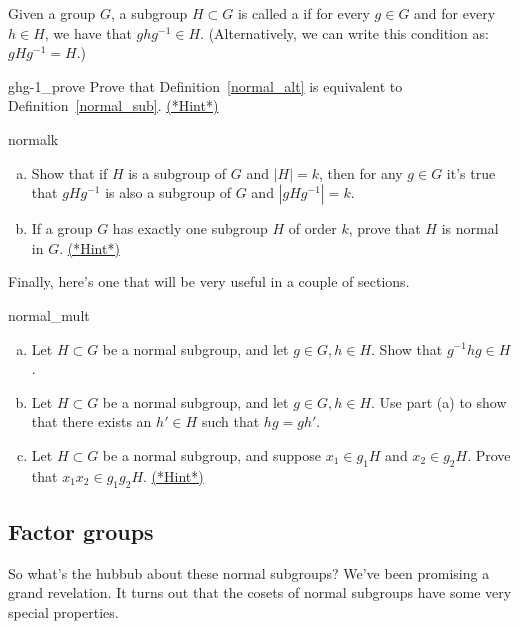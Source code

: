 {\begin{defn}\label{normal_alt}
 Given a group $G$, a subgroup $H \subset G$ is called a 
 if for every $g \in G$ and for every $h \in H$, we have that $ghg^{-1} \in H$.  (Alternatively, we can write this condition as: $gHg^{-1} = H$.)
\end{defn}

\begin{exercise}{ghg-1_prove}
Prove that Definition~\ref{normal_alt} is equivalent to Definition~\ref{normal_sub}.
\hyperref[sec:cosets:hints]{(*Hint*)}
\end{exercise}


\begin{exercise}{normalk}
\begin{enumerate}[(a)]
\item
Show that if $H$ is a subgroup of $G$ and $|H|=k$, then for any $g \in G$ it's true that $gHg^{-1}$ is also a subgroup of $G$ and $|gHg^{-1}|=k$.
\item
If a group $G$ has exactly one subgroup $H$ of order $k$, prove that
$H$ is normal in $G$.
\hyperref[sec:cosets:hints]{(*Hint*)}
\end{enumerate}
\end{exercise}

Finally, here's one that will be very useful in a couple of sections.

\begin{exercise}{normal_mult}
\begin{enumerate}[(a)]
\item
Let $H \subset G$ be a normal subgroup, and let $g \in G, h \in H$.  Show that $g^{-1}hg \in H$.
\item
Let $H \subset G$ be a normal subgroup, and let $g \in G, h \in H$. Use part (a) to show that there exists an $h' \in H$ such that $hg = g h'$.
\item
Let $H \subset G$ be a normal subgroup, and suppose $x_1 \in g_1H$ and $x_2 \in g_2H$. Prove that $x_1x_2 \in g_1g_2H$.
\hyperref[sec:cosets:hints]{(*Hint*)}
\end{enumerate}
\end{exercise}  

\subsection{Factor groups}\label{sec:factor_groups}
 
So what's the hubbub about these normal subgroups?  We've been promising a grand revelation.  It turns out that the cosets of normal subgroups have some very special properties.

}
